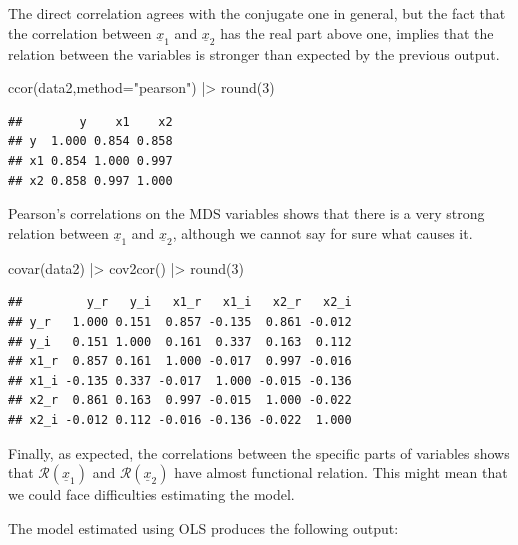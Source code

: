 \documentclass[
]{book}
\newenvironment{Shaded}{\begin{snugshade}}{\end{snugshade}}
\newcommand{\AttributeTok}[1]{\textcolor[rgb]{0.77,0.63,0.00}{#1}}
\newcommand{\DecValTok}[1]{\textcolor[rgb]{0.00,0.00,0.81}{#1}}
\newcommand{\FunctionTok}[1]{\textcolor[rgb]{0.00,0.00,0.00}{#1}}
\newcommand{\NormalTok}[1]{#1}
\newcommand{\SpecialCharTok}[1]{\textcolor[rgb]{0.00,0.00,0.00}{#1}}
\newcommand{\StringTok}[1]{\textcolor[rgb]{0.31,0.60,0.02}{#1}}
\begin{document}
The direct correlation agrees with the conjugate one in general, but the fact that the correlation between \(\underline{x}_{1}\) and \(\underline{x}_{2}\) has the real part above one, implies that the relation between the variables is stronger than expected by the previous output.

\begin{Shaded}
\begin{Highlighting}[]
\FunctionTok{ccor}\NormalTok{(data2,}\AttributeTok{method=}\StringTok{"pearson"}\NormalTok{) }\SpecialCharTok{|\textgreater{}} \FunctionTok{round}\NormalTok{(}\DecValTok{3}\NormalTok{)}
\end{Highlighting}
\end{Shaded}

\begin{verbatim}
##        y    x1    x2
## y  1.000 0.854 0.858
## x1 0.854 1.000 0.997
## x2 0.858 0.997 1.000
\end{verbatim}

Pearson's correlations on the MDS variables shows that there is a very strong relation between \(\underline{x}_{1}\) and \(\underline{x}_{2}\), although we cannot say for sure what causes it.

\begin{Shaded}
\begin{Highlighting}[]
\FunctionTok{covar}\NormalTok{(data2) }\SpecialCharTok{|\textgreater{}} \FunctionTok{cov2cor}\NormalTok{() }\SpecialCharTok{|\textgreater{}} \FunctionTok{round}\NormalTok{(}\DecValTok{3}\NormalTok{)}
\end{Highlighting}
\end{Shaded}

\begin{verbatim}
##         y_r   y_i   x1_r   x1_i   x2_r   x2_i
## y_r   1.000 0.151  0.857 -0.135  0.861 -0.012
## y_i   0.151 1.000  0.161  0.337  0.163  0.112
## x1_r  0.857 0.161  1.000 -0.017  0.997 -0.016
## x1_i -0.135 0.337 -0.017  1.000 -0.015 -0.136
## x2_r  0.861 0.163  0.997 -0.015  1.000 -0.022
## x2_i -0.012 0.112 -0.016 -0.136 -0.022  1.000
\end{verbatim}

Finally, as expected, the correlations between the specific parts of variables shows that \(\mathcal{R}\left(\underline{x}_1\right)\) and \(\mathcal{R}\left(\underline{x}_2\right)\) have almost functional relation. This might mean that we could face difficulties estimating the model.

The model estimated using OLS produces the following output:
\end{document}
